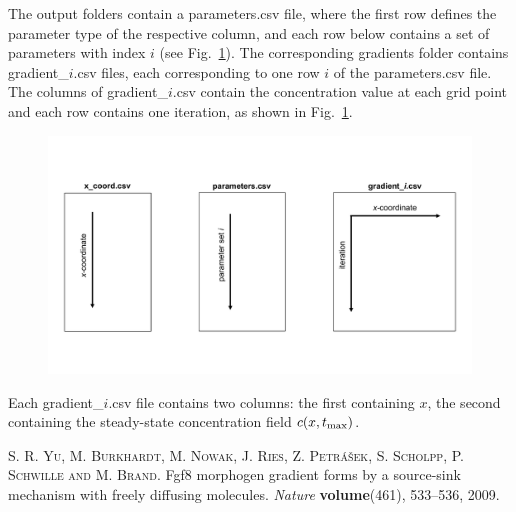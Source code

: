 \documentclass[11pt]{article}
\begin{document}
The output folders contain a parameters.csv file, where the first row defines the parameter type of the respective column, and each row below contains a set of parameters with index $i$ (see Fig.~\ref{fig:description_csv_files}). The corresponding gradients folder contains gradient\_$i$.csv files, each corresponding to one row $i$ of the parameters.csv file. The columns of gradient\_$i$.csv contain the concentration value at each grid point and each row contains one iteration, as shown in Fig.~\ref{fig:description_csv_files}.

\begin{figure}[htbp!]
\footnotesize
    \centering
    \captionsetup{width=1.0 \textwidth}
    \includegraphics[width=1.0\textwidth]{./description_csv_files.pdf}
    \caption{}
\label{fig:description_csv_files}
\end{figure}


Each gradient\_$i$.csv file contains two columns: the first containing $x$, the second containing the steady-state concentration field $c(x, t_{\rm{max}})$.


\begin{thebibliography}{9}
  \textsc{S. R. Yu, M. Burkhardt, M. Nowak, J. Ries, Z. Petr\'a\v{s}ek, S. Scholpp, P. Schwille and M. Brand}. Fgf8 morphogen gradient forms by a source-sink mechanism with freely diffusing molecules.
  \emph{Nature} \textbf{volume}(461),
  533--536, 2009.	
\end{thebibliography}
\end{document}
